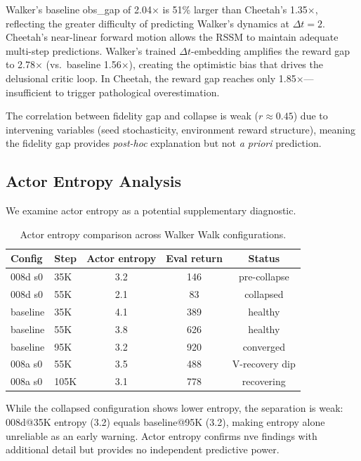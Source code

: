 \documentclass[10pt,letterpaper]{article}
\begin{document}
Walker's baseline obs\_gap of 2.04$\times$ is 51\% larger than Cheetah's 1.35$\times$, reflecting the greater difficulty of predicting Walker's dynamics at $\Delta t{=}2$. Cheetah's near-linear forward motion allows the RSSM to maintain adequate multi-step predictions. Walker's trained $\Delta t$-embedding amplifies the reward gap to 2.78$\times$ (vs.\ baseline 1.56$\times$), creating the optimistic bias that drives the delusional critic loop. In Cheetah, the reward gap reaches only 1.85$\times$---insufficient to trigger pathological overestimation.

The correlation between fidelity gap and collapse is weak ($r \approx 0.45$) due to intervening variables (seed stochasticity, environment reward structure), meaning the fidelity gap provides \emph{post-hoc} explanation but not \emph{a priori} prediction.

\subsection{Actor Entropy Analysis}
\label{sec:entropy}

We examine actor entropy as a potential supplementary diagnostic.

\begin{table}[h]
\centering
\caption{Actor entropy comparison across Walker Walk configurations.}
\label{tab:entropy}
\begin{tabular}{llccc}
\toprule
Config & Step & Actor entropy & Eval return & Status \\
\midrule
008d s0 & 35K & 3.2 & 146 & pre-collapse \\
008d s0 & 55K & 2.1 & 83 & collapsed \\
baseline & 35K & 4.1 & 389 & healthy \\
baseline & 55K & 3.8 & 626 & healthy \\
baseline & 95K & 3.2 & 920 & converged \\
008a s0 & 55K & 3.5 & 488 & V-recovery dip \\
008a s0 & 105K & 3.1 & 778 & recovering \\
\bottomrule
\end{tabular}
\end{table}

While the collapsed configuration shows lower entropy, the separation is weak: 008d@35K entropy (3.2) equals baseline@95K (3.2), making entropy alone unreliable as an early warning. Actor entropy confirms nve findings with additional detail but provides no independent predictive power.
\end{document}
